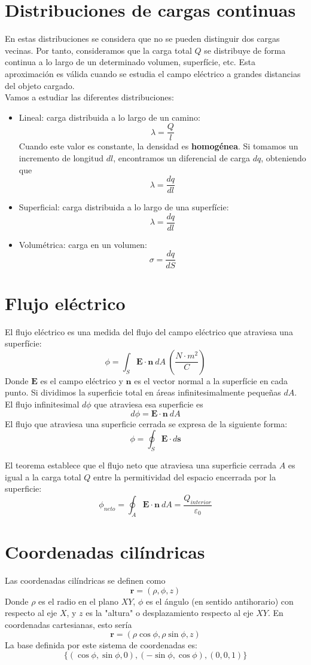 \documentclass{../FisicaII.tex}
\begin{document}
\section{Distribuciones de cargas continuas}
En estas distribuciones se considera que no se pueden distinguir dos cargas vecinas. Por tanto, consideramos que la carga total $Q$ se distribuye de forma continua a lo largo de un determinado volumen, superfície, etc. Esta aproximación es válida cuando se estudia el campo eléctrico a grandes distancias del objeto cargado.\\
Vamos a estudiar las diferentes distribuciones:
\begin{itemize}
	\item Lineal: carga distribuida a lo largo de un camino:
		\[
			\lambda=\frac{Q}{l}
		\]
	Cuando este valor es constante, la densidad es \textbf{homogénea}. Si tomamos un incremento de longitud $dl$, encontramos un diferencial de carga $dq$, obteniendo que
	\[
		\lambda = \frac{dq}{dl}
	\]
\item Superficial: carga distribuida a lo largo de una superfície:
	\[
		\lambda = \frac{dq}{dl}
	\]
\item Volumétrica: carga en un volumen:
	\[
		\sigma = \frac{dq}{dS}
	\]
\end{itemize}
\section{Flujo eléctrico}
El flujo eléctrico es una medida del flujo del campo eléctrico que atraviesa una superfície:
$$
\phi = \int_{S} \mathbf{E}\cdot \mathbf{n}~dA~\left( \frac{N\cdot m^{2}}{C} \right)
$$
Donde $\mathbf{E}$ es el campo eléctrico y $\mathbf{n}$ es el vector normal a la superfície en cada punto.
Si dividimos la superficie total en áreas infinitesimalmente pequeñas $dA$. El flujo infinitesimal $d\phi$ que atraviesa esa superficie es
$$
d\phi=\mathbf{E}\cdot \mathbf{n}~dA
$$
El flujo que atraviesa una superficie cerrada se expresa de la siguiente forma:
$$
\phi = \oint_{S} \mathbf{E}\cdot d \mathbf{s}
$$
\begin{teorema}
El teorema establece que el flujo neto que atraviesa una superficie cerrada $A$ es igual a la carga total $Q$ entre la permitividad del espacio encerrada por la superficie:
$$
\phi_{neto}=\oint_{A} \mathbf{E}\cdot \mathbf{n}~dA=\frac{Q_{interior}}{\varepsilon_{0}}
$$
\end{teorema}
\section{Coordenadas cilíndricas}
Las coordenadas cilíndricas se definen como
$$
\mathbf{r}=(\rho, \phi, z)
$$
Donde $\rho$ es el radio en el plano $XY$, $\phi$ es el ángulo (en sentido antihorario) con respecto al eje $X$, y $z$ es la "altura" o desplazamiento respecto al eje $XY$. En coordenadas cartesianas, esto sería
$$
\mathbf{r}=(\rho \cos \phi, \rho \sin \phi, z)
$$
La base definida por este sistema de coordenadas es:
$$
\{(\cos \phi,\sin \phi,0), (-\sin \phi,\cos \phi), (0,0,1) \}
$$
\end{document}
